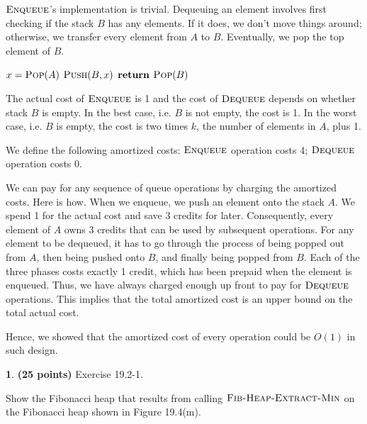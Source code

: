 \documentclass[11pt]{article}
\theoremstyle{definition}
\theoremstyle{theorem}
\newtheorem{prob}{}
\begin{document}
$\textproc{\textsc{Enqueue}}$'s implementation is trivial. Dequeuing an element involves first checking if the stack $B$ has any elements. If it does, we don't move things around; otherwise, we transfer every element from $A$ to $B$. Eventually, we pop the top element of $B$.

\begin{algorithmic}[1]
			\State $x = \textproc{\textsc{Pop}}(A)$
			\State $\textproc{\textsc{Push}}(B, x)$
		\EndWhile
	\EndIf
	\State $\textbf{return } \textproc{\textsc{Pop}}(B)$
\EndFunction
\end{algorithmic}

The actual cost of $\textproc{\textsc{Enqueue}}$ is 1 and the cost of $\textproc{\textsc{Dequeue}}$ depends on whether stack $B$ is empty. In the best case, i.e. $B$ is not empty, the cost is 1. In the worst case, i.e. $B$ is empty, the cost is two times $k$, the number of elements in $A$, plus 1.

We define the following amortized costs: $\textproc{\textsc{Enqueue}}$ operation costs 4; $\textproc{\textsc{Dequeue}}$ operation costs 0.

We can pay for any sequence of queue operations by charging the amortized costs. Here is how. When we enqueue, we push an element onto the stack $A$. We spend 1 for the actual cost and save 3 credits for later. Consequently, every element of $A$ owns 3 credits that can be used by subsequent operations. For any element to be dequeued, it has to go through the process of being popped out from $A$, then being pushed onto $B$, and finally being popped from $B$. Each of the three phases costs exactly 1 credit, which has been prepaid when the element is enqueued. Thus, we have always charged enough up front to pay for $\textproc{\textsc{Dequeue}}$ operations. This implies that the total amortized cost is an upper bound on the total actual cost. 

Hence, we showed that the amortized cost of every operation could be $O(1)$ in such design.


\newpage
\begin{prob} \textbf{(25 points)} Exercise 19.2-1.
\end{prob}

Show the Fibonacci heap that results from calling $\textproc{\textsc{Fib-Heap-Extract-Min}}$ on the Fibonacci heap shown in Figure 19.4(m).
\end{document}
